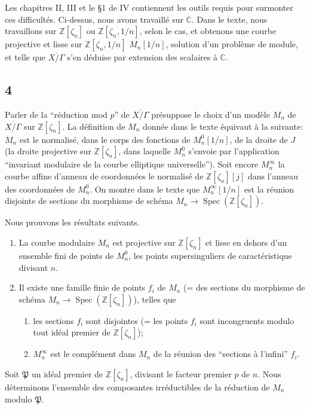 \documentclass{amsart}
\theoremstyle{plain}
\theoremstyle{remark}
\DeclareMathOperator{\Spec}{Spec}
\newcommand{\bbC}{\mathbb{C}}
\newcommand{\bbZ}{\mathbb{Z}}
\newcommand{\fP}{\mathfrak{P}}
\begin{document}
Les chapitres II, III et le \S 1 de IV contiennent les outils requis pour surmonter ces difficult\'es. Ci-dessus, nous avons travaill\'e sur $\bbC$. Dans le texte, nous travaillons sur $\bbZ[\zeta_n]$ ou $\bbZ[\zeta_n, 1/n]$, selon le cas, et obtenons une courbe projective et lisse sur $\bbZ[\zeta_n, 1/n]$ $M_n[1/n]$, solution d'un probl\`eme de module, et telle que $\overline{X/\Gamma}$ s'en d\'eduise par extension des scalaires \`a $\bbC$.

\subsection*{4}
Parler de la ``r\'eduction mod $p$'' de $\overline{X/\Gamma}$ pr\'esuppose le choix d'un mod\`ele $M_n$ de $\overline{X/\Gamma}$ sur $\bbZ[\zeta_n]$. La d\'efinition de $M_n$ donn\'ee dans le texte \'equivaut \`a la suivante: $M_n$ est le normalis\'e, dans le corps des fonctions de $M_n^0[1/n]$, de la droite de $J$ (la droite projective sur $\bbZ[\zeta_n]$, dans laquelle $M_n^0$ s'envoie par l'application ``invariant modulaire de la courbe elliptique universelle''). Soit encore $M_n^\infty$ la courbe affine d'anneau de coordonn\'ees le normalis\'e de $\bbZ[\zeta_n][j]$ dans l'anneau des coordonn\'ees de $M_n^0$. On montre dans le texte que $M_n^\infty[1/n]$ est la r\'eunion disjointe de sections du morphisme de sch\'ema $M_n \to \Spec(\bbZ[\zeta_n])$.

Nous prouvons les r\'esultats suivants.

\begin{enumerate}
\item[a)] La courbe modulaire $M_n$ est projective sur $\bbZ[\zeta_n]$ et lisse en dehors d'un ensemble fini de points de $M_n^0$, les points supersinguliers de caract\'eristique divisant $n$.
\item[b)] Il existe une famille finie de points $f_i$ de $M_n$ (= des sections du morphisme de sch\'ema $M_n \to \Spec(\bbZ[\zeta_n])$), telles que
\begin{enumerate}
\item[(b1)] les sections $f_i$ sont disjointes (= les points $f_i$ sont incongruents modulo tout id\'eal premier de $\bbZ[\zeta_n]$);
\item[(b2)] $M_n^\infty$ est le compl\'ement dans $M_n$ de la r\'eunion des ``sections \`a l'infini'' $f_i$.
\end{enumerate}
\end{enumerate}

Soit $\fP$ un id\'eal premier de $\bbZ[\zeta_n]$, divisant le facteur premier $p$ de $n$. Nous d\'eterminons l'ensemble des composantes irr\'eductibles de la r\'eduction de $M_n$ modulo $\fP$.
\end{document}
